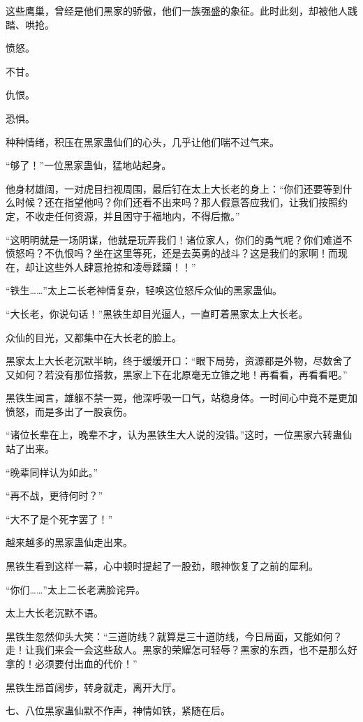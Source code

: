 \begin{this_body}
这些鹰巢，曾经是他们黑家的骄傲，他们一族强盛的象征。此时此刻，却被他人践踏、哄抢。

愤怒。

不甘。

仇恨。

恐惧。

种种情绪，积压在黑家蛊仙们的心头，几乎让他们喘不过气来。

“够了！”一位黑家蛊仙，猛地站起身。

他身材雄阔，一对虎目扫视周围，最后钉在太上大长老的身上：“你们还要等到什么时候？还在指望他吗？你们还看不出来吗？那人假意答应我们，让我们按照约定，不收走任何资源，并且困守于福地内，不得后撤。”

“这明明就是一场阴谋，他就是玩弄我们！诸位家人，你们的勇气呢？你们难道不愤怒吗？不仇恨吗？坐在这里等死，还是去英勇的战斗？这是我们的家啊！而现在，却让这些外人肆意抢掠和凌辱蹂躏！！”

“铁生……”太上二长老神情复杂，轻唤这位怒斥众仙的黑家蛊仙。

“大长老，你说句话！”黑铁生却目光逼人，一直盯着黑家太上大长老。

众仙的目光，又都集中在大长老的脸上。

黑家太上大长老沉默半晌，终于缓缓开口：“眼下局势，资源都是外物，尽数舍了又如何？若没有那位搭救，黑家上下在北原毫无立锥之地！再看看，再看看吧。”

黑铁生闻言，雄躯不禁一晃，他深呼吸一口气，站稳身体。一时间心中竟不是更加愤怒，而是多出了一股哀伤。

“诸位长辈在上，晚辈不才，认为黑铁生大人说的没错。”这时，一位黑家六转蛊仙站了出来。

“晚辈同样认为如此。”

“再不战，更待何时？”

“大不了是个死字罢了！”

越来越多的黑家蛊仙走出来。

黑铁生看到这样一幕，心中顿时提起了一股劲，眼神恢复了之前的犀利。

“你们……”太上二长老满脸诧异。

太上大长老沉默不语。

黑铁生忽然仰头大笑：“三道防线？就算是三十道防线，今日局面，又能如何？走！让我们来会一会这些敌人。黑家的荣耀怎可轻辱？黑家的东西，也不是那么好拿的！必须要付出血的代价！”

黑铁生昂首阔步，转身就走，离开大厅。

七、八位黑家蛊仙默不作声，神情如铁，紧随在后。


\end{this_body}
